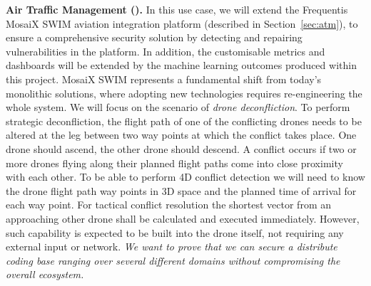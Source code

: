 \begin{Workpackage}{\thewpno}
\begin{Task}
\textbf{Air Traffic Management (\FRQshort{}).} 
In this use case, we will extend the Frequentis MosaiX SWIM aviation integration platform (described in Section~\ref{sec:atm}), to ensure a comprehensive security solution by detecting and repairing vulnerabilities in the platform. In addition, the customisable metrics and dashboards will be extended by the machine learning outcomes produced within this project. MosaiX SWIM represents a fundamental shift from today’s monolithic solutions, where adopting new technologies requires re-engineering the whole system. We will focus on the scenario of \emph{drone deconfliction}. To perform strategic deconfliction, the flight path of one of the conflicting drones needs to be altered at the leg between two way points at which the conflict takes place. One drone should ascend, the other drone should descend. A conflict occurs if two or more drones flying along their planned flight paths come into close proximity with each other. To be able to perform 4D conflict detection we will need to know the drone flight path way points in 3D space and the planned time of arrival for each way point. For tactical conflict resolution the shortest vector from an approaching other drone shall be calculated and executed immediately. However, such capability is expected to be built into the drone itself, not requiring any external input or network. \emph{We want to prove that we can secure a distribute coding base ranging over several different domains without compromising the overall ecosystem.}




\end{Task}
\end{Workpackage}
